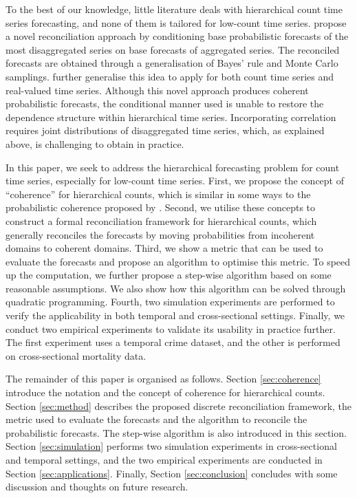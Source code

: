 \documentclass[a4paper,review,12pt,authoryear]{elsarticle}
\begin{document}
To the best of our knowledge, little literature deals with hierarchical count time series forecasting, and none of them is tailored for low-count time series.
\cite{coraniProbabilisticReconciliationCount2022} propose a novel reconciliation approach by conditioning base probabilistic forecasts of the most disaggregated series on base forecasts of aggregated series. 
The reconciled forecasts are obtained through a generalisation of Bayes’ rule and Monte Carlo samplings.
\cite{zambonEfficientProbabilisticReconciliation2022} further generalise this idea to apply for both count time series and real-valued time series.
Although this novel approach produces coherent probabilistic forecasts, 
the conditional manner used is unable to restore the dependence structure within hierarchical time series.
Incorporating correlation requires joint distributions of disaggregated time series, which, as explained above, is challenging to obtain in practice.

In this paper, we seek to address the hierarchical forecasting problem for count time series, especially for low-count time series.
First, we propose the concept of ``coherence'' for hierarchical counts, 
which is similar in some ways to the probabilistic coherence proposed by \cite{panagiotelisProbabilisticForecastReconciliation2022}.
Second, we utilise these concepts to construct a formal reconciliation framework for hierarchical counts, which generally reconciles the forecasts by moving probabilities from incoherent domains to coherent domains.
Third, we show a metric that can be used to evaluate the forecasts and propose an algorithm to optimise this metric. 
To speed up the computation, we further propose a step-wise algorithm based on some reasonable assumptions.
We also show how this algorithm can be solved through quadratic programming.
Fourth, two simulation experiments are performed to verify the applicability 
in both temporal and cross-sectional settings.
Finally, we conduct two empirical experiments to validate its usability in practice further. The first experiment uses a temporal crime dataset, and the other is performed on cross-sectional mortality data.

The remainder of this paper is organised as follows. 
Section \ref{sec:coherence} introduce the notation and the concept of coherence for hierarchical counts.
Section \ref{sec:method} describes the proposed discrete reconciliation framework, the metric used to evaluate the forecasts and the algorithm to reconcile the probabilistic forecasts. 
The step-wise algorithm is also introduced in this section.
Section \ref{sec:simulation} performs two simulation experiments in cross-sectional and temporal settings, and the two empirical experiments are conducted in Section \ref{sec:applications}. Finally, Section \ref{sec:conclusion} concludes with some discussion and thoughts on future research.
\end{document}
